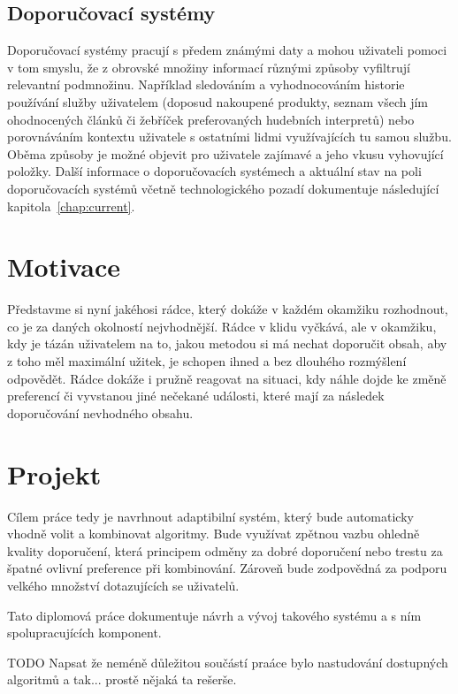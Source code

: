 \documentclass[thesis=M,czech]{FITthesis}[2014/05/07]
\begin{document}
\begin{introduction}
	\subsection{Doporučovací systémy}
	\label{sub:recsys}
 Doporučovací systémy pracují s předem známými daty a mohou uživateli pomoci v tom smyslu, že z obrovské množiny informací různými způsoby vyfiltrují relevantní podmnožinu. Například sledováním a vyhodnocováním historie používání služby uživatelem (doposud nakoupené produkty, seznam všech jím ohodnocených článků či žebříček preferovaných hudebních interpretů) nebo porovnáváním kontextu uživatele s ostatními lidmi využívajících tu samou službu. Oběma způsoby je možné objevit pro uživatele zajímavé a jeho vkusu vyhovující položky.
 Další informace o doporučovacích systémech a aktuální stav na poli doporučovacích systémů včetně technologického pozadí dokumentuje následující kapitola~\ref{chap:current}.

	\section{Motivace} 	
		
	Představme si nyní jakéhosi rádce, který dokáže v každém okamžiku rozhodnout, co je za daných okolností nejvhodnější. Rádce v klidu vyčkává, ale v okamžiku, kdy je tázán uživatelem na to, jakou metodou si má nechat doporučit obsah, aby z toho měl maximální užitek, je schopen ihned a bez dlouhého rozmýšlení odpovědět. Rádce dokáže i pružně reagovat na situaci, kdy náhle dojde ke změně preferencí či vyvstanou jiné nečekané události, které mají za následek doporučování nevhodného obsahu.
	
	\section{Projekt}
	Cílem práce tedy je navrhnout adaptibilní systém, který bude automaticky vhodně volit a kombinovat algoritmy. Bude využívat zpětnou vazbu ohledně kvality doporučení, která principem odměny za dobré doporučení nebo trestu za špatné ovlivní preference při kombinování. Zároveň bude zodpovědná za podporu velkého množství dotazujících se uživatelů.	
	
	Tato diplomová práce dokumentuje návrh a vývoj takového systému a s ním spolupracujících komponent.	
	
	TODO Napsat že neméně důležitou součástí praáce bylo nastudování dostupných algoritmů a tak... prostě nějaká ta rešerše.
	

\end{introduction}
\end{document}
